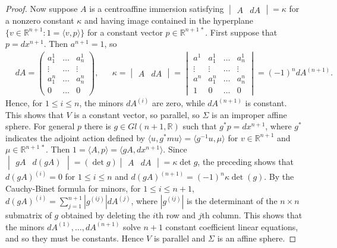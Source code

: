 \documentclass [leqno, 10pt]{amsart}
\theoremstyle{definition}
\numberwithin{equation}{section}
\newcommand{\ka}{\kappa}
\newcommand{\lb}{\langle}
\newcommand{\ra}{\rangle}
\newcommand{\rea}{\mathbb R}
\begin{document}
\begin{proof}
Now suppose $A$ is a centroaffine immersion satisfying $\begin{vmatrix} A & dA \end{vmatrix} = \ka$ for a nonzero constant $\ka$ and having image contained in the hyperplane $\{v \in \rea^{n+1}: 1 = \lb v, p\ra\}$ for a constant vector $p \in \rea^{n+1\,\ast}$. First suppose that $p = dx^{n+1}$. Then $a^{n+1} = 1$, so 
\begin{align}\label{damin}
&dA = \begin{pmatrix}
a^{1}_{1} & \dots & a^{1}_{n}\\ \vdots & \dots & \vdots \\ a^{n}_{1} & \dots & a^{n}_{n}\\ 0 & \dots & 0 
\end{pmatrix},& &\ka  = \begin{vmatrix} A & dA \end{vmatrix} = \begin{vmatrix} a^{1} & a^{1}_{1} & \dots & a^{1}_{n}\\ \vdots & \vdots & \dots & \vdots \\a^{n} & a^{n}_{1} & \dots & a^{n}_{n}\\ 1 & 0 & \dots & 0 \end{vmatrix} = (-1)^{n}dA^{(n+1)}.
\end{align}
Hence, for $1 \leq i \leq n$, the minors $dA^{(i)}$ are zero, while $dA^{(n+1)}$ is constant.
This shows that $V$ is a constant vector, so parallel, so $\Sigma$ is an improper affine sphere. For general $p$ there is $g \in Gl(n+1, \rea)$ such that $g^{\ast}p = dx^{n+1}$, where $g^{\ast}$ indicates the adjoint action defined by $\lb u, g^{\ast}mu \ra = \lb g^{-1}u, \mu\ra$ for $v \in \rea^{n+1}$ and $\mu \in \rea^{n+1\,\ast}$. Then $1 = \lb A, p \ra = \lb gA, dx^{n+1}\ra$. Since $\begin{vmatrix} gA & d(gA) \end{vmatrix} =(\det g)\begin{vmatrix} A & dA \end{vmatrix} = \ka \det g$, the preceding shows that $d(gA)^{(i)} = 0$ for $1 \leq i \leq n$ and $d(gA)^{(n+1)} = (-1)^{n}\ka \det(g)$. By the Cauchy-Binet formula for minors, for $1 \leq i \leq n+1$, $d(gA)^{(i)} = \sum_{j = 1}^{n+1}|g^{(ij)}|dA^{(j)}$, where $|g^{(ij)}|$ is the determinant of the $n \times n$ submatrix of $g$ obtained by deleting the $i$th row and $j$th column. This shows that the minors $dA^{(1)}, \dots, dA^{(n+1)}$ solve $n+1$ constant coefficient linear equations, and so they must be constants. Hence $V$ is parallel and $\Sigma$ is an affine sphere.
\end{proof}
\end{document}
